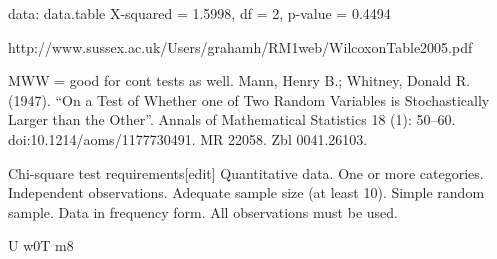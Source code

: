 \documentclass[10pt,twocolumn]{article}
\begin{document}
data:  data.table
X-squared = 1.5998, df = 2, p-value = 0.4494

http://www.sussex.ac.uk/Users/grahamh/RM1web/WilcoxonTable2005.pdf



MWW = good for cont tests as well.
 Mann, Henry B.; Whitney, Donald R. (1947). ``On a Test of Whether one of Two Random Variables is Stochastically Larger than the Other''. Annals of Mathematical Statistics 18 (1): 50–60. doi:10.1214/aoms/1177730491. MR 22058. Zbl 0041.26103.












Chi-square test requirements[edit]
Quantitative data.
One or more categories.
Independent observations.
Adequate sample size (at least 10).
Simple random sample.
Data in frequency form.
All observations must be used.




U w0T m8
\end{document}
